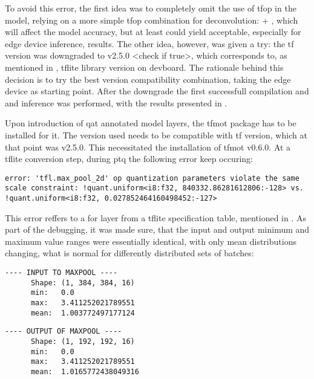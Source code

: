 {To avoid this error, the first idea was to completely omit the use of  \gls{tfop} in the model, relying on a more simple \gls{tfop} combination for deconvolution:
 + , which will affect the model accuracy, but at least could yield acceptable, especially for edge device inference, results. The other idea, however,
was given a try: the \gls{tf} version was downgraded to v2.5.0 <check if true>, which corresponds to, as mentioned in ,
\gls{tflite} library version on \gls{devboard}. The rationale behind this decision is to try the best version compatibility combination, taking the edge device as starting point.
After the downgrade the first successfull compilation and and inference was performed, with the results presented in .

Upon introduction of \gls{qat} annotated model layers, the \gls{tfmot} package has to be installed for it. The version used needs to be compatible with \gls{tf} version,
which at that point was v2.5.0. This necessitated the installation of \gls{tfmot} v0.6.0. At a \gls{tflite} conversion step, during \gls{ptq} the following error keep occuring:

\begin{lstlisting}
error: 'tfl.max_pool_2d' op quantization parameters violate the same scale constraint: !quant.uniform<i8:f32, 840332.86281612806:-128> vs. !quant.uniform<i8:f32, 0.027852464160498452:-127>
\end{lstlisting}


This error reffers to a  for  layer from a \gls{tflite} specification table,
mentioned in . As part of the debugging, it was made sure, that the input and output minimum and maximum value ranges were essentially identical,
with only mean distributions changing, what is normal for differently distributed sets of batches:

\noindent
\begin{minipage}[t]{0.48\textwidth}
\begin{lstlisting}[basicstyle=\ttfamily\small\centering, columns=fullflexible, keepspaces=true, frame=single]
      ---- INPUT TO MAXPOOL ----
      Shape: (1, 384, 384, 16)
      min:   0.0
      max:   3.411252021789551
      mean:  1.003772497177124
\end{lstlisting}
\end{minipage}%
\hfill
\begin{minipage}[t]{0.48\textwidth}
\begin{lstlisting}[basicstyle=\ttfamily\small\centering, columns=fullflexible, keepspaces=true, frame=single]
      ---- OUTPUT OF MAXPOOL ----
      Shape: (1, 192, 192, 16)
      min:   0.0
      max:   3.411252021789551
      mean:  1.0165772438049316
\end{lstlisting}
\end{minipage}


}
